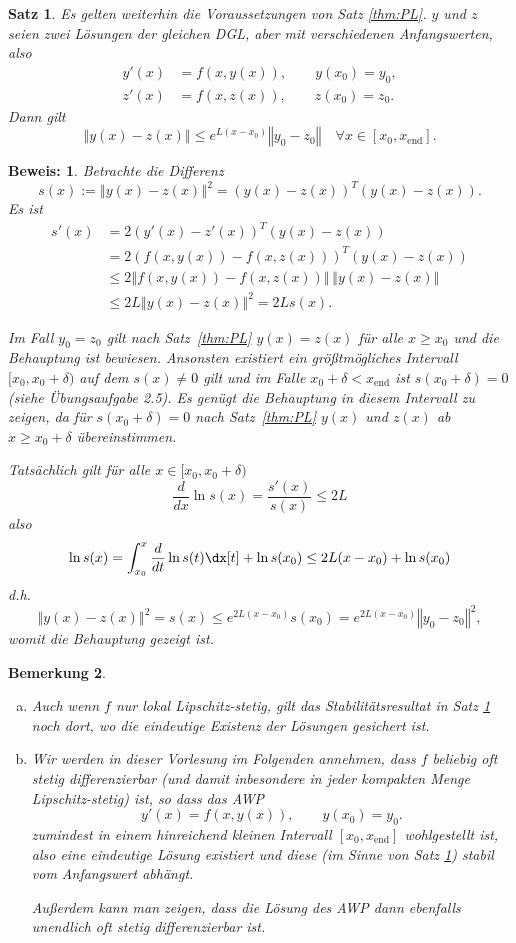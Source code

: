 \documentclass[
]{mycourse}
\theoremstyle{mythm}
\newtheorem{theorem}{Satz}[chapter]
\newtheorem{bemerkung}[theorem]{Bemerkung}
\theoremstyle{break}
\newtheorem*{beweis}{Beweis:}
\newcommand{\norm}[1]{\left\Vert#1\right\Vert}		%
\begin{document}
\begin{theorem}\label{thm:stability}
Es gelten weiterhin die Voraussetzungen von Satz \ref{thm:PL}.
$y$ und $z$ seien zwei Lösungen der gleichen DGL, aber mit verschiedenen Anfangswerten, also
\begin{align*}
y'(x)&=f(x,y(x)), \qquad y(x_0)=y_0,\\
z'(x)&=f(x,z(x)), \qquad z(x_0)=z_0.
\end{align*}
Dann gilt
\[
\norm{y(x)-z(x)} \leq e^{L (x-x_0)} \norm{y_0-z_0} \quad \forall x\in [x_0,x_\mathrm{end}].
\]
\end{theorem}
\begin{beweis}
Betrachte die Differenz
\[
s(x):=\norm{y(x)-z(x)}^2=(y(x)-z(x))^T (y(x)-z(x)).
\]
Es ist
\begin{align*}
s'(x) &= 2 (y'(x)-z'(x))^T (y(x)-z(x))\\
 &= 2 (f(x,y(x))-f(x,z(x)))^T (y(x)-z(x))\\
&\leq 2 \norm{ f(x,y(x))-f(x,z(x)) }\, \norm{y(x)-z(x)}\\
&\leq 2 L \norm{y(x)-z(x)}^2=2L s(x).
\end{align*}

Im Fall $y_0=z_0$ gilt nach Satz~\ref{thm:PL} $y(x)=z(x)$ für alle $x\geq x_0$ und die Behauptung ist bewiesen. Ansonsten existiert ein größtmögliches Intervall $[x_0,x_0+\delta)$ auf dem 
$s(x)\neq 0$ gilt und im Falle $x_0+\delta<x_\mathrm{end}$ ist $s(x_0+\delta)=0$
(siehe Übungsaufgabe 2.5). Es genügt die Behauptung in diesem Intervall zu zeigen,
da für $s(x_0+\delta)=0$ nach Satz~\ref{thm:PL} $y(x)$ und $z(x)$
ab $x\geq x_0+\delta$ übereinstimmen.

Tatsächlich gilt für alle $x\in [x_0,x_0+\delta)$
\[
\frac{d}{d x} \ln s(x)=\frac{s'(x)}{s(x)}\leq 2L
\]
also
\[
\ln s(x)=\int_{x_0}^x \frac{d}{d t} \ln s(t) \dx[t] + \ln s(x_0) \leq 2L (x-x_0) + \ln s(x_0)
\]
d.h.
\[
\norm{y(x)-z(x)}^2=s(x)\leq e^{2L(x-x_0)} s(x_0)=e^{2L(x-x_0)} \norm{y_0-z_0}^2,
\]
womit die Behauptung gezeigt ist.
\end{beweis}
%

\begin{bemerkung}
\begin{enumerate}[(a)]
\item Auch wenn $f$ nur lokal Lipschitz-stetig, gilt das Stabilitätsresultat in Satz \ref{thm:stability} noch dort, wo die eindeutige Existenz der Lösungen gesichert ist.

\item 
Wir werden in dieser Vorlesung im Folgenden annehmen, dass $f$ beliebig oft stetig differenzierbar (und damit inbesondere in jeder kompakten Menge Lipschitz-stetig) ist, so dass das AWP
\[
y'(x)=f(x,y(x)), \qquad y(x_0)=y_0.
\]
zumindest in einem hinreichend kleinen Intervall $[x_0,x_\mathrm{end}]$ wohlgestellt ist, also 
eine eindeutige Lösung existiert und diese (im Sinne von Satz \ref{thm:stability}) stabil vom
Anfangswert abhängt.

Außerdem kann man zeigen, dass die Lösung des AWP dann ebenfalls unendlich oft stetig 
differenzierbar ist.
\end{enumerate}
\end{bemerkung}
\end{document}
